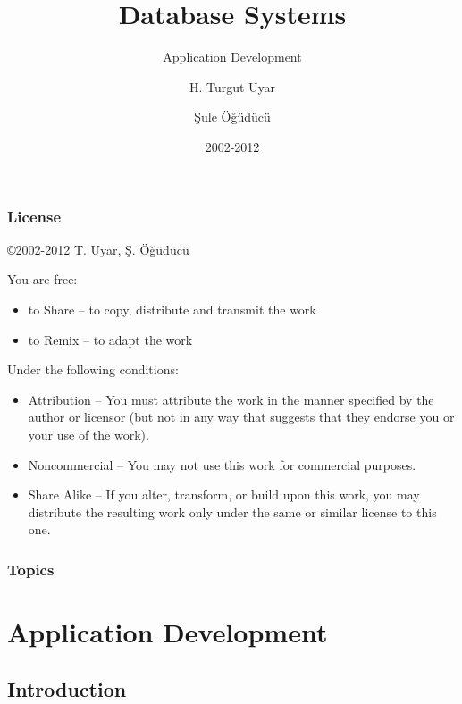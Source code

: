 \documentclass[dvipsnames]{beamer}
\title{Database Systems}
\subtitle{Application Development}
\author{H. Turgut Uyar \and Şule Öğüdücü}
\date{2002-2012}
\theoremstyle{plain}
\begin{document}
\begin{frame}
  \titlepage
\end{frame}

\begin{frame}
  \frametitle{License}

  \hfill
  \copyright 2002-2012 T. Uyar, Ş. Öğüdücü

  \vfill
  \begin{tiny}
    You are free:
    \begin{itemize}
      \item to Share -- to copy, distribute and transmit the work
      \item to Remix -- to adapt the work
    \end{itemize}

    Under the following conditions:
    \begin{itemize}
      \item Attribution -- You must attribute the work in the manner specified by
        the author or licensor (but not in any way that suggests that they
        endorse you or your use of the work).

      \item Noncommercial -- You may not use this work for commercial purposes.

      \item Share Alike -- If you alter, transform, or build upon this work, you
        may distribute the resulting work only under the same or similar license
        to this one.
    \end{itemize}
  \end{tiny}
\end{frame}

\begin{frame}
  \frametitle{Topics}
  \tableofcontents
\end{frame}

\section{Application Development}

\lstset{language=C}

\subsection{Introduction}
\end{document}
